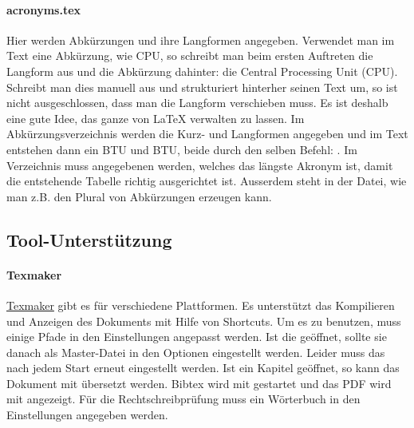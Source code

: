 \paragraph{acronyms.tex}
%
Hier werden Abkürzungen und ihre Langformen angegeben.
Verwendet man im Text eine Abkürzung, wie CPU, so schreibt man beim ersten
Auftreten die Langform aus und die Abkürzung dahinter: 
die Central Processing Unit (CPU).
Schreibt man dies manuell aus und strukturiert hinterher seinen Text um, 
so ist nicht ausgeschlossen, dass man die Langform verschieben muss.
Es ist deshalb eine gute Idee, das ganze von \LaTeX{} verwalten zu lassen.
Im Abkürzungsverzeichnis werden die Kurz- und Langformen angegeben und
im Text entstehen dann ein \ac{BTU} und \ac{BTU}, beide durch den selben
Befehl: .
Im Verzeichnis muss angegebenen werden, welches das längste Akronym ist, damit
die entstehende Tabelle richtig ausgerichtet ist.
Ausserdem steht in der Datei, wie man z.B. den Plural von Abkürzungen erzeugen kann.
%
\subsection{Tool-Unterstützung}
%
\paragraph{Texmaker}
%
\href{http://www.xm1math.net/texmaker/}{Texmaker}
gibt es für verschiedene Plattformen.
Es unterstützt das Kompilieren und Anzeigen des Dokuments mit Hilfe von
Shortcuts.
Um es zu benutzen, muss einige Pfade in den Einstellungen angepasst werden.
Ist die  geöffnet, sollte sie danach als Master-Datei in den 
Optionen eingestellt werden.
Leider muss das nach jedem Start erneut eingestellt werden.
Ist ein Kapitel geöffnet, so kann das Dokument mit  übersetzt werden.
Bibtex wird mit  gestartet und das PDF wird mit  angezeigt.
Für die Rechtschreibprüfung muss ein Wörterbuch in den Einstellungen angegeben
werden.
%
